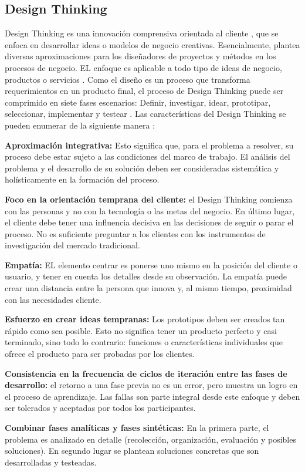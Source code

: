 \subsection{Design Thinking}

Design Thinking es una innovación comprensiva orientada al cliente , que se enfoca en desarrollar ideas o modelos de negocio creativas. Esencialmente, plantea diversas aproximaciones para los diseñadores de proyectos y métodos en los procesos de negocio. EL enfoque es aplicable a todo tipo de ideas de negocio, productos o servicios \parencite{mueller2018}. Como el diseño es un proceso que transforma requerimientos en un producto final, el proceso de Design Thinking puede ser comprimido en siete fases escenarios: Definir, investigar, idear, prototipar, seleccionar, implementar y testear \parencite{ambrose2010}. Las características del Design Thinking se pueden enumerar de la siguiente manera \parencite{mueller2018}:

\begin{description}
\item \textbf{Aproximación integrativa:} Esto significa que, para el problema a resolver, su proceso debe estar sujeto a las condiciones del marco de trabajo. El análisis del problema y el desarrollo de su solución deben ser consideradas sistemática y holísticamente en la formación del proceso. 
\item \textbf{Foco en la orientación temprana del cliente:} el Design Thinking comienza con las personas y no con la tecnología o las metas del negocio. En último lugar, el cliente debe tener una influencia decisiva en las decisiones de seguir o parar el proceso. No es suficiente preguntar a los clientes con los instrumentos de investigación del mercado tradicional.
\item \textbf{Empatía:} EL elemento centrar es ponerse uno mismo en la posición del cliente o usuario, y tener en cuenta los detalles desde su observación. La empatía puede crear una distancia entre la persona que innova y, al mismo tiempo, proximidad con las necesidades cliente.
\item \textbf{Esfuerzo en crear ideas tempranas:} Los prototipos deben ser creados tan rápido como sea posible. Esto no significa tener un producto perfecto y casi terminado, sino todo lo contrario: funciones o características individuales que ofrece el producto para ser probadas por los clientes.
\item \textbf{Consistencia en la frecuencia de ciclos de iteración entre las fases de desarrollo:} el retorno a una fase previa no es un error, pero muestra un logro en el proceso de aprendizaje. Las fallas son parte integral desde este enfoque y deben ser tolerados y aceptadas por todos los participantes.
\item \textbf{Combinar fases analíticas y fases sintéticas:} En la primera parte, el problema es analizado en detalle (recolección, organización, evaluación y posibles soluciones). En segundo lugar se plantean soluciones concretas que son desarrolladas y testeadas.
\end{description}


